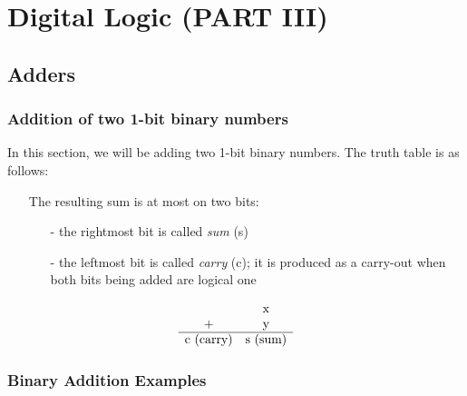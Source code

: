 \documentclass[12pt,openany]{book}
\begin{document}
			      	
			      	
			      	\chapter{Digital Logic (PART III)}
			      	\section{Adders}
			      	\subsection{Addition of two 1-bit binary numbers}
			      	In this section, we will be adding two 1-bit binary numbers. The truth table is as follows:
			      	\begin{itemize}
			      		\item[] The resulting sum is at most on two bits:
			      		      \begin{itemize}
			      		      	\item[-] the rightmost bit is called \textit{sum} (s)
			      		      	\item[-] the leftmost bit is called \textit{carry} (c); it is produced as a carry-out when both bits being added are logical one
			      		      \end{itemize}
			      	\end{itemize}
			      	
			      	
			      	\[
			      		\begin{array}{cccccc}
			      			            & $x$       \\
			      			+           & $y$       \\
			      			\hline
			      			$c (carry)$ & $s (sum)$ \\
			      		\end{array}
			      	\]
			      	    
			      	\subsection{Binary Addition Examples}
			      	
\end{document}
